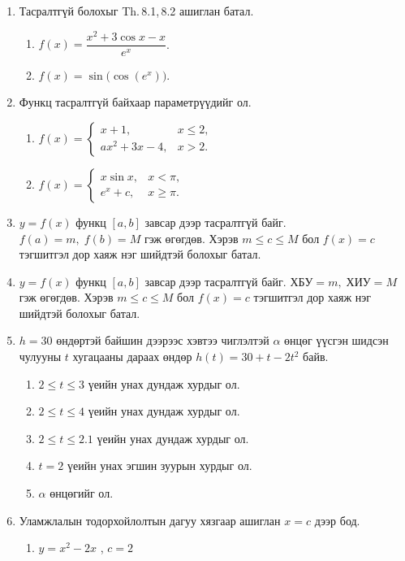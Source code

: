 \begin{enumerate}
(a) $x=-2$, \quad (b) $x=-1$, \quad (c) $x=0$, \quad (d) $x=1$, \quad (e) $x=2$, \quad (f) $x=3$.
\item Тасралтгүй болохыг Th.\,8.1,\,8.2 ашиглан батал.
\begin{enumerate}[label=\alph*)]
  \item $f(x)=\dfrac{x^{2}+3\cos x - x}{e^{x}}$.
  \item $f(x)=\sin\!\big(\cos(e^{x})\big)$.
\end{enumerate}
\item Функц тасралтгүй байхаар параметрүүдийг ол.
\begin{enumerate}[label=\alph*)]
  \item $f(x)=
  \begin{cases}
    x+1, & x\le 2,\\
    a x^{2}+3x-4, & x>2.
  \end{cases}$
  \item $f(x)=
  \begin{cases}
    x\sin x, & x<\pi,\\
    e^{x}+c, & x\ge \pi.
  \end{cases}$
\end{enumerate}
\item $y=f(x)$ функц $[a,b]$ завсар дээр тасралтгүй байг.  
$f(a)=m,\; f(b)=M$ гэж өгөгдөв.  
Хэрэв $m \le c \le M$ бол $f(x)=c$ тэгшитгэл дор хаяж нэг шийдтэй болохыг батал.
\item $y=f(x)$ функц $[a,b]$ завсар дээр тасралтгүй байг.  
$ХБУ=m,\; ХИУ=M$ гэж өгөгдөв.  
Хэрэв $m \le c \le M$ бол $f(x)=c$ тэгшитгэл дор хаяж нэг шийдтэй болохыг батал.
\item $h=30$ өндөртэй байшин дээрээс хэвтээ чиглэлтэй $\alpha$ өнцөг үүсгэн шидсэн чулууны $t$ хугацааны дараах өндөр $h(t)=30+t-2t^2$ байв.
\begin{enumerate}[label=(\alph*)]
  \item $2\leq t\leq 3$ үеийн унах дундаж хурдыг ол. 
    \item $2\leq t\leq 4$ үеийн унах дундаж хурдыг ол.
    \item $2\leq t\leq 2.1$ үеийн унах дундаж хурдыг ол.
    \item $t=2$ үеийн унах эгшин зуурын хурдыг ол.
    \item $\alpha$ өнцөгийг ол.
\end{enumerate}
\item Уламжлалын тодорхойлолтын дагуу хязгаар ашиглан $x=c$ дээр бод.
\begin{enumerate}[label=(\alph*)]
  \item $y = x^{2} - 2x$ , $c=2$

\end{enumerate}
\end{enumerate}
